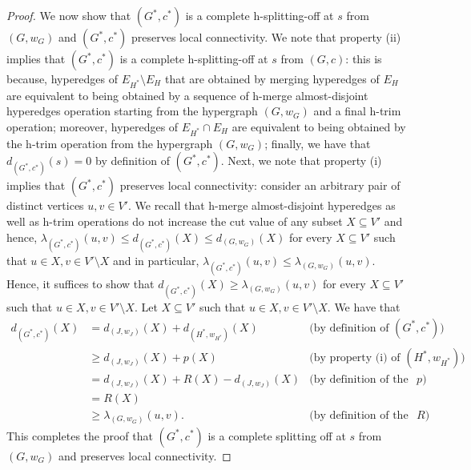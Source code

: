 \documentclass{article}
\begin{document}
\begin{proof}
    We now show that $(G^*, c^*)$ is a complete h-splitting-off at $s$ from $(G, w_G)$ and $(G^*, c^*)$ preserves local connectivity. 
    We note that property (ii) implies that $(G^*, c^*)$ is a complete h-splitting-off at $s$ from $(G, c)$: this is because, 
    hyperedges of $E_{H^*}\setminus E_H$ that are obtained by merging hyperedges of $E_H$ are equivalent to being obtained by a sequence of h-merge almost-disjoint hyperedges operation starting from the hypergraph $(G, w_G)$ and a final h-trim operation; 
    moreover, hyperedges of $E_{H^*}\cap E_H$ are equivalent to being obtained by the h-trim operation from the hypergraph $(G, w_G)$;  
    finally, we have that $d_{(G^*, c^*)}(s)=0$ by definition of $(G^*, c^*)$. 
    Next, we note that property (i) implies that $(G^*, c^*)$ preserves local connectivity: consider an arbitrary pair of distinct vertices $u, v\in V'$. We recall that h-merge almost-disjoint hyperedges as well as h-trim operations do not increase the cut value of any subset $X\subseteq V'$ and hence, $\lambda_{(G^*, c^*)}(u, v) \le d_{(G^*, c^*)}(X)\le d_{(G, w_G)}(X)$ for every $X\subseteq V'$ such that $u\in X, v\in V'\setminus X$ and in particular, $\lambda_{(G^*, c^*)}(u, v) \le \lambda_{(G, w_G)}(u, v)$. Hence, it suffices to show that $d_{(G^*, c^*)}(X)\ge \lambda_{(G, w_G)}(u, v)$ for every $X\subseteq V'$ such that $u\in X, v\in V'\setminus X$. Let $X\subseteq V'$ such that $u\in X, v\in V'\setminus X$. We have that 
    \begin{align*}
    d_{(G^*, c^*)}(X)
    &=d_{(J, w_J)}(X) + d_{(H^*, w_{H^*})}(X) & \text{(by definition of $(G^*, c^*)$)}\\
    &\ge d_{(J, w_J)}(X) +p(X) & \text{(by property (i) of $(H^*, w_{H^*})$)}\\
    &=d_{(J, w_J)}(X) +R(X)-d_{(J, w_J)}(X) & \text{(by definition of the function $p$)}\\
    &=R(X) \\
    &\ge \lambda_{(G, w_G)}(u,v). & \text{(by definition of the function $R$)}
    \end{align*}
    This completes the proof that $(G^*, c^*)$ is a complete splitting off at $s$ from $(G, w_G)$ and preserves local connectivity. 
    

\end{proof}
\end{document}
